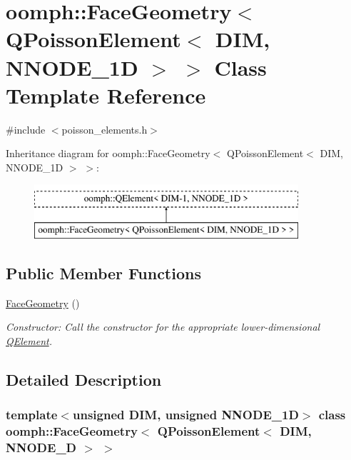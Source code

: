 \hypertarget{classoomph_1_1FaceGeometry_3_01QPoissonElement_3_01DIM_00_01NNODE__1D_01_4_01_4}{}\section{oomph\+:\+:Face\+Geometry$<$ Q\+Poisson\+Element$<$ D\+IM, N\+N\+O\+D\+E\+\_\+1D $>$ $>$ Class Template Reference}
\label{classoomph_1_1FaceGeometry_3_01QPoissonElement_3_01DIM_00_01NNODE__1D_01_4_01_4}


{\ttfamily \#include $<$poisson\+\_\+elements.\+h$>$}

Inheritance diagram for oomph\+:\+:Face\+Geometry$<$ Q\+Poisson\+Element$<$ D\+IM, N\+N\+O\+D\+E\+\_\+1D $>$ $>$\+:\begin{figure}[H]
\begin{center}
\leavevmode
\includegraphics[height=2.000000cm]{classoomph_1_1FaceGeometry_3_01QPoissonElement_3_01DIM_00_01NNODE__1D_01_4_01_4}
\end{center}
\end{figure}
\subsection*{Public Member Functions}
\begin{DoxyCompactItemize}
\item 
\hyperlink{classoomph_1_1FaceGeometry_3_01QPoissonElement_3_01DIM_00_01NNODE__1D_01_4_01_4_a954702ded1d713906350fa118d8c9aa2}{Face\+Geometry} ()
\begin{DoxyCompactList}\small\item\em Constructor\+: Call the constructor for the appropriate lower-\/dimensional \hyperlink{classoomph_1_1QElement}{Q\+Element}. \end{DoxyCompactList}\end{DoxyCompactItemize}


\subsection{Detailed Description}
\subsubsection*{template$<$unsigned D\+IM, unsigned N\+N\+O\+D\+E\+\_\+1D$>$\newline
class oomph\+::\+Face\+Geometry$<$ Q\+Poisson\+Element$<$ D\+I\+M, N\+N\+O\+D\+E\+\_\+D $>$ $>$}


